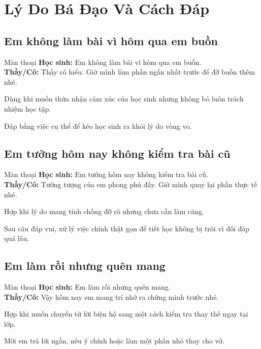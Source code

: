 \chapter{Lý Do Bá Đạo Và Cách Đáp}

\section{Em không làm bài vì hôm qua em buồn}
\begin{manthoai}{Màn thoại}
\textbf{Học sinh:} Em không làm bài vì hôm qua em buồn.\\
\textbf{Thầy/Cô:} Thầy cô hiểu. Giờ mình làm phần ngắn nhất trước để đỡ buồn thêm nhé.
\end{manthoai}
\begin{dungkhinào}
Dùng khi muốn thừa nhận cảm xúc của học sinh nhưng không bỏ luôn trách nhiệm học tập.
\end{dungkhinào}
\begin{nhipthem}
Đáp bằng việc cụ thể để kéo học sinh ra khỏi lý do vòng vo.
\end{nhipthem}
\ngancach

\section{Em tưởng hôm nay không kiểm tra bài cũ}
\begin{manthoai}{Màn thoại}
\textbf{Học sinh:} Em tưởng hôm nay không kiểm tra bài cũ.\\
\textbf{Thầy/Cô:} Tưởng tượng của em phong phú đấy. Giờ mình quay lại phần thực tế nhé.
\end{manthoai}
\begin{dungkhinào}
Hợp khi lý do mang tính chống đỡ rõ nhưng chưa cần làm căng.
\end{dungkhinào}
\begin{nhipthem}
Sau câu đáp vui, xử lý việc chính thật gọn để tiết học không bị trôi vì đối đáp quá lâu.
\end{nhipthem}
\ngancach

\section{Em làm rồi nhưng quên mang}
\begin{manthoai}{Màn thoại}
\textbf{Học sinh:} Em làm rồi nhưng quên mang.\\
\textbf{Thầy/Cô:} Vậy hôm nay em mang trí nhớ ra chứng minh trước nhé.
\end{manthoai}
\begin{dungkhinào}
Hợp khi muốn chuyển từ lời biện hộ sang một cách kiểm tra thay thế ngay tại lớp.
\end{dungkhinào}
\begin{nhipthem}
Mời em trả lời ngắn, nêu ý chính hoặc làm một phần nhỏ thay cho vở.
\end{nhipthem}
\ngancach

